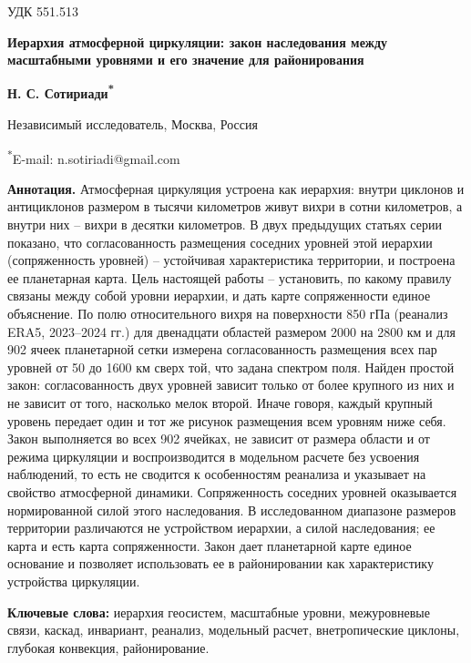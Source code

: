 \documentclass[12pt,a4paper]{article}
\begin{document}
\noindent УДК 551.513

\begin{center}
{\large\bfseries Иерархия атмосферной циркуляции: закон наследования между масштабными уровнями и его значение для районирования}

\medskip
{\bfseries Н. С. Сотириади\textsuperscript{*}}

Независимый исследователь, Москва, Россия

\textsuperscript{*}E-mail: n.sotiriadi@gmail.com
\end{center}

\begin{singlespace}
\noindent\textbf{Аннотация.} Атмосферная циркуляция устроена как иерархия: внутри циклонов и антициклонов размером в тысячи километров живут вихри в сотни километров, а внутри них -- вихри в десятки километров. В двух предыдущих статьях серии показано, что согласованность размещения соседних уровней этой иерархии (сопряженность уровней) -- устойчивая характеристика территории, и построена ее планетарная карта. Цель настоящей работы -- установить, по какому правилу связаны между собой уровни иерархии, и дать карте сопряженности единое объяснение. По полю относительного вихря на поверхности 850 гПа (реанализ ERA5, 2023--2024 гг.) для двенадцати областей размером 2000 на 2800 км и для 902 ячеек планетарной сетки измерена согласованность размещения всех пар уровней от 50 до 1600 км сверх той, что задана спектром поля. Найден простой закон: согласованность двух уровней зависит только от более крупного из них и не зависит от того, насколько мелок второй. Иначе говоря, каждый крупный уровень передает один и тот же рисунок размещения всем уровням ниже себя. Закон выполняется во всех 902 ячейках, не зависит от размера области и от режима циркуляции и воспроизводится в модельном расчете без усвоения наблюдений, то есть не сводится к особенностям реанализа и указывает на свойство атмосферной динамики. Сопряженность соседних уровней оказывается нормированной силой этого наследования. В исследованном диапазоне размеров территории различаются не устройством иерархии, а силой наследования; ее карта и есть карта сопряженности. Закон дает планетарной карте единое основание и позволяет использовать ее в районировании как характеристику устройства циркуляции.

\smallskip
\noindent\textbf{Ключевые слова:} иерархия геосистем, масштабные уровни, межуровневые связи, каскад, инвариант, реанализ, модельный расчет, внетропические циклоны, глубокая конвекция, районирование.
\end{singlespace}
\end{document}
